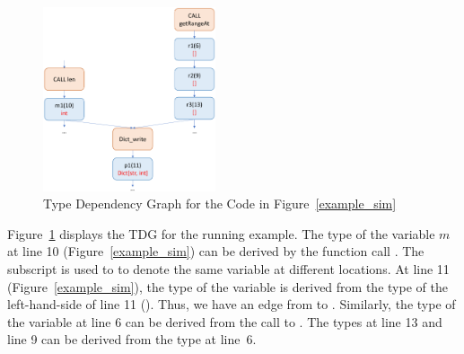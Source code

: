 

\begin{figure}[t]
	\begin{center}
	  \includegraphics[width=2in]{figures/type-dep-graph-2}
          \vspace{-8pt}
		\caption{Type Dependency Graph for the Code in Figure~\ref{example_sim}}
		\label{tdg}
	\end{center}
\end{figure}

Figure~\ref{tdg} displays the TDG for the running example. The
type of the variable $m$ at line 10 (Figure~\ref{example_sim}) can be
derived by the function call . The subscript is used to to
denote the same variable at different locations. At line 11
(Figure~\ref{example_sim}), the type of the variable  is
derived from the type of the left-hand-side of line 11
(). Thus, we have an edge from  to
. Similarly, the type of the variable  at line 6 can
be derived from the call to . The types at line 13
and line 9 can be derived from the type at line~6.
